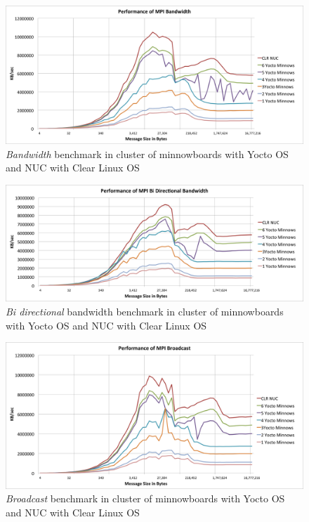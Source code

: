 \begin{figure}[H]
\centering
\includegraphics[width=1.0\textwidth]{images/mpbench_cluster_experiments/mpi_bandwidth.png}
\caption{\textit{Bandwidth} benchmark in cluster of minnowboards with Yocto OS and NUC
with Clear Linux OS}
\label{all_to_all_cluster}
\end{figure}

\begin{figure}[H]
\centering
\includegraphics[width=1.0\textwidth]{images/mpbench_cluster_experiments/mpi_bibw.png}
\caption{\textit{Bi directional} bandwidth benchmark in cluster of minnowboards with Yocto OS and NUC
with Clear Linux OS}
\label{all_to_all_cluster}
\end{figure}


\begin{figure}[H]
\centering
\includegraphics[width=1.0\textwidth]{images/mpbench_cluster_experiments/mpi_broadcast.png}
\caption{\textit{Broadcast} benchmark in cluster of minnowboards with Yocto OS and NUC
with Clear Linux OS}
\label{all_to_all_cluster}
\end{figure}

